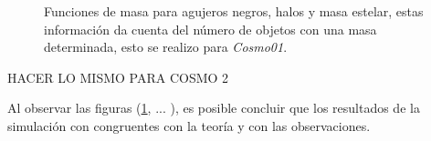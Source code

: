 \begin{figure}
 \centering
 \caption{Funciones de masa para agujeros negros, halos y masa estelar, estas información da cuenta del número de objetos con una masa determinada, esto se realizo para {\it{Cosmo01}}. }
 \label{fig: Funciones de masa}
\end{figure}
 HACER LO MISMO PARA COSMO 2

Al observar las figuras (\ref{fig: Funciones de masa}, ... ), es posible concluir que los resultados de la simulación con congruentes con la teoría y con las observaciones. 








